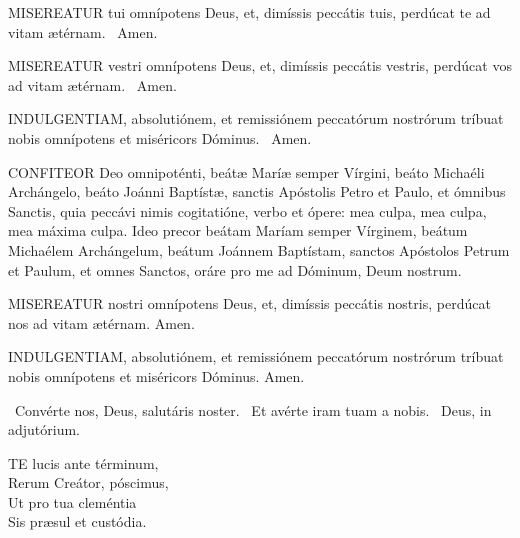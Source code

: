 
\lettrine[lines=2]{M}{ISEREATUR} tui omnípotens Deus, et, dimíssis peccátis tuis, perdúcat te ad vitam ætérnam. \R\ Amen.



\lettrine[lines=2]{M}{ISEREATUR} vestri omnípotens Deus, et, dimíssis peccátis vestris, perdúcat vos ad vitam ætérnam. \R\ Amen.

\lettrine[lines=2]{I}{NDULGENTIAM}, absolutiónem, et remissiónem peccatórum nostrórum tríbuat nobis omnípotens et miséricors Dóminus. \R\ Amen.


\lettrine[lines=2]{C}{ONFITEOR} Deo omnipoténti, beátæ Maríæ semper Vírgini, beáto Michaéli Archángelo, beáto Joánni Baptístæ, sanctis Apóstolis Petro et Paulo, et ómnibus Sanctis, quia peccávi nimis cogitatióne, verbo et ópere: mea culpa, mea culpa, mea máxima culpa. Ideo precor beátam Maríam semper Vírginem, beátum Michaélem Archángelum, beátum Joánnem Baptístam, sanctos Apóstolos Petrum et Paulum, et omnes Sanctos, oráre pro me ad Dóminum, Deum nostrum.


\lettrine[lines=2]{M}{ISEREATUR} nostri omnípotens Deus, et, dimíssis peccátis nostris, perdúcat nos ad vitam ætérnam. Amen.

\lettrine[lines=2]{I}{NDULGENTIAM}, absolutiónem, et remissiónem peccatórum nostrórum tríbuat nobis omnípotens et miséricors Dóminus. Amen.


\V\ Convérte nos, Deus, salutáris noster. \R\ Et avérte iram tuam a nobis. \V\ Deus, in adjutórium.




\lettrine[lines=2]{T}{E} lucis ante términum,\\
Rerum Creátor, póscimus,\\
Ut pro tua cleméntia\\
Sis præsul et custódia.

